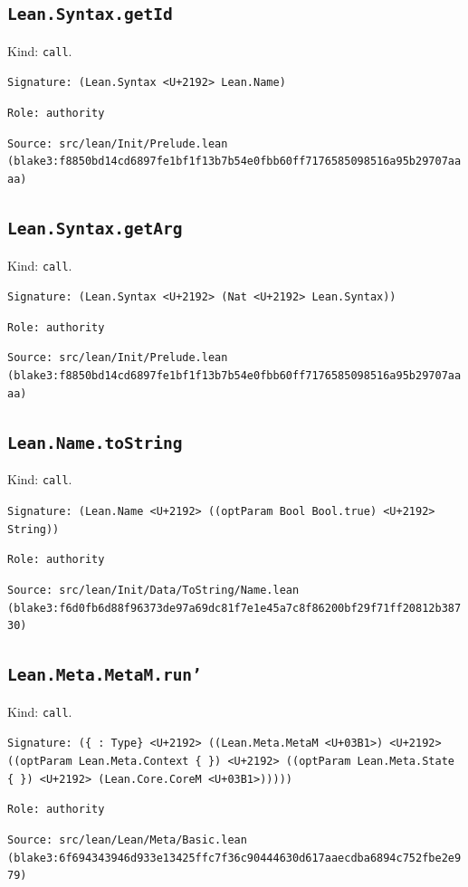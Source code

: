 \documentclass[11pt]{article}
\begin{document}
\subsection*{\texttt{Lean.Syntax.getId}}
\noindent Kind: \texttt{call}.\par
\noindent \texttt{Signature: (Lean.Syntax <U+2192> Lean.Name)}\par
\noindent \texttt{Role: authority}\par
\noindent \texttt{Source: src/lean/Init/Prelude.lean (blake3:f8850bd14cd6897fe1bf1f13b7b54e0fbb60ff7176585098516a95b29707aaaa)}\par
\subsection*{\texttt{Lean.Syntax.getArg}}
\noindent Kind: \texttt{call}.\par
\noindent \texttt{Signature: (Lean.Syntax <U+2192> (Nat <U+2192> Lean.Syntax))}\par
\noindent \texttt{Role: authority}\par
\noindent \texttt{Source: src/lean/Init/Prelude.lean (blake3:f8850bd14cd6897fe1bf1f13b7b54e0fbb60ff7176585098516a95b29707aaaa)}\par
\subsection*{\texttt{Lean.Name.toString}}
\noindent Kind: \texttt{call}.\par
\noindent \texttt{Signature: (Lean.Name <U+2192> ((optParam Bool Bool.true) <U+2192> String))}\par
\noindent \texttt{Role: authority}\par
\noindent \texttt{Source: src/lean/Init/Data/ToString/Name.lean (blake3:f6d0fb6d88f96373de97a69dc81f7e1e45a7c8f86200bf29f71ff20812b38730)}\par
\subsection*{\texttt{Lean.Meta.MetaM.run'}}
\noindent Kind: \texttt{call}.\par
\noindent \texttt{Signature: (\{<U+03B1> : Type\} <U+2192> ((Lean.Meta.MetaM <U+03B1>) <U+2192> ((optParam Lean.Meta.Context \{ \}) <U+2192> ((optParam Lean.Meta.State \{ \}) <U+2192> (Lean.Core.CoreM <U+03B1>)))))}\par
\noindent \texttt{Role: authority}\par
\noindent \texttt{Source: src/lean/Lean/Meta/Basic.lean (blake3:6f694343946d933e13425ffc7f36c90444630d617aaecdba6894c752fbe2e979)}\par
\end{document}
